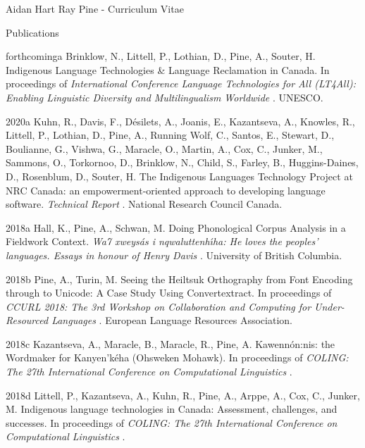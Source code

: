 \documentclass[12pt]{letter}
\begin{document}
\begin{cv}{ Aidan Hart Ray Pine  \space - \space   Curriculum Vitae}
        \begin{cvlist}{Publications}
                                                                        \item[forthcominga] Brinklow, N., Littell, P., Lothian, D., Pine, A., Souter, H.  Indigenous Language Technologies \& Language Reclamation in Canada. In proceedings of \textit{ International Conference Language Technologies for All (LT4All): Enabling Linguistic Diversity and Multilingualism Worldwide }.  UNESCO.  
                                                                                                            \item[2020a]  Kuhn,  R.,  Davis,  F.,  D{\'e}silets,  A.,  Joanis,  E.,  Kazantseva,  A.,  Knowles,  R.,  Littell,  P.,  Lothian,  D.,  Pine,  A.,  Running Wolf,  C.,  Santos,  E.,  Stewart,  D.,  Boulianne,  G.,  Vishwa,  G.,  Maracle,  O.,  Martin,  A.,  Cox,  C.,  Junker,  M.,  Sammons,  O.,  Torkornoo,  D.,  Brinklow,  N.,  Child,  S.,  Farley,  B.,  Huggins-Daines,  D.,  Rosenblum,  D.,  Souter,  H.  The Indigenous Languages Technology Project at NRC Canada: an empowerment-oriented approach to developing language software. \textit{ Technical Report }.  National Research Council Canada.  
                                                                                                                                                                            \item[2018a]  Hall,  K.,  Pine,  A.,  Schwan,  M.  Doing Phonological Corpus Analysis in a Fieldwork Context. \textit{ Wa7 xweys{\'a}s i nqwaluttenh{\'\i}ha: He loves the peoples' languages. Essays in honour of Henry Davis }.  University of British Columbia.  
                                                                                \item[2018b] Pine, A., Turin, M.  Seeing the Heiltsuk Orthography from Font Encoding through to Unicode: A Case Study Using Convertextract. In proceedings of \textit{ CCURL 2018: The 3rd Workshop on Collaboration and Computing for Under-Resourced Languages }.  European Language Resources Association.  
                                                                                \item[2018c] Kazantseva, A., Maracle, B., Maracle, R., Pine, A.  Kawenn{\'o}n:nis: the Wordmaker for Kanyen'k{\'e}ha (Ohsweken Mohawk). In proceedings of \textit{ COLING: The 27th International Conference on Computational Linguistics }.  
                                                                                \item[2018d] Littell, P., Kazantseva, A., Kuhn, R., Pine, A., Arppe, A., Cox, C., Junker, M.  Indigenous language technologies in Canada: Assessment, challenges, and successes. In proceedings of \textit{ COLING: The 27th International Conference on Computational Linguistics }.  

\end{cvlist}
\end{cv}
\end{document}
